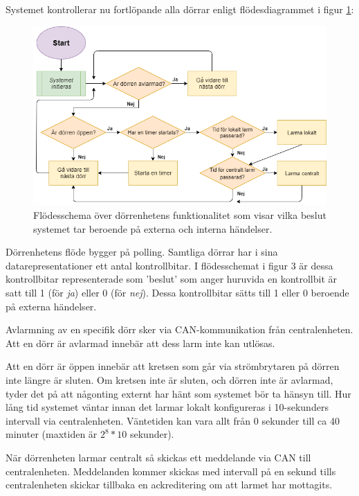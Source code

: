 \documentclass{article}
\begin{document}
Systemet kontrollerar nu fortlöpande alla dörrar enligt flödesdiagrammet i figur \ref{fig:dörrflöde}:



\begin{figure}[H]
\begin{flushleft}
\end{flushleft}
\centering
\includegraphics[scale=0.5]{figurer/Flow-Chart.png}
\caption{Flödesschema över dörrenhetens funktionalitet som visar vilka beslut systemet tar beroende på externa och interna händelser.}
\label{fig:dörrflöde}
\end{figure}

Dörrenhetens flöde bygger på polling. Samtliga dörrar har i sina datarepresentationer
ett antal kontrollbitar. I flödesschemat i figur 3 är dessa kontrollbitar representerade
som 'beslut' som anger huruvida en kontrollbit är satt till 1 (för \textit{ja}) eller 0
(för \textit{nej}). Dessa kontrollbitar sätts till 1 eller 0 beroende på externa händelser.

Avlarmning av en specifik dörr sker via CAN-kommunikation från centralenheten. Att en dörr är avlarmad
innebär att dess larm inte kan utlösas.

Att en dörr är öppen innebär att kretsen som går via strömbrytaren på dörren inte längre är sluten.
Om kretsen inte är sluten, och dörren inte är avlarmad, tyder det på att någonting externt har hänt 
som systemet bör ta hänsyn till. Hur lång tid systemet väntar innan det larmar lokalt konfigureras i
 10-sekunders intervall via centralenheten. Väntetiden kan vara allt från 0 sekunder till ca 40 minuter
   (maxtiden är $2^8 *10$ sekunder).

När dörrenheten larmar centralt så skickas ett meddelande via CAN till centralenheten. Meddelanden
kommer skickas med intervall på en sekund tills centralenheten skickar tillbaka en ackreditering om att larmet har
 mottagits.
\end{document}

